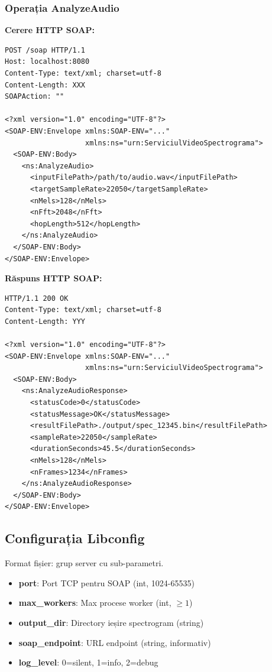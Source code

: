 \documentclass[12pt,a4paper,twoside]{article}
\begin{document}
\subsubsection{Operația AnalyzeAudio}

\textbf{Cerere HTTP SOAP:}

\begin{lstlisting}
POST /soap HTTP/1.1
Host: localhost:8080
Content-Type: text/xml; charset=utf-8
Content-Length: XXX
SOAPAction: ""

<?xml version="1.0" encoding="UTF-8"?>
<SOAP-ENV:Envelope xmlns:SOAP-ENV="..." 
                   xmlns:ns="urn:ServiciulVideoSpectrograma">
  <SOAP-ENV:Body>
    <ns:AnalyzeAudio>
      <inputFilePath>/path/to/audio.wav</inputFilePath>
      <targetSampleRate>22050</targetSampleRate>
      <nMels>128</nMels>
      <nFft>2048</nFft>
      <hopLength>512</hopLength>
    </ns:AnalyzeAudio>
  </SOAP-ENV:Body>
</SOAP-ENV:Envelope>
\end{lstlisting}

\textbf{Răspuns HTTP SOAP:}

\begin{lstlisting}
HTTP/1.1 200 OK
Content-Type: text/xml; charset=utf-8
Content-Length: YYY

<?xml version="1.0" encoding="UTF-8"?>
<SOAP-ENV:Envelope xmlns:SOAP-ENV="..." 
                   xmlns:ns="urn:ServiciulVideoSpectrograma">
  <SOAP-ENV:Body>
    <ns:AnalyzeAudioResponse>
      <statusCode>0</statusCode>
      <statusMessage>OK</statusMessage>
      <resultFilePath>./output/spec_12345.bin</resultFilePath>
      <sampleRate>22050</sampleRate>
      <durationSeconds>45.5</durationSeconds>
      <nMels>128</nMels>
      <nFrames>1234</nFrames>
    </ns:AnalyzeAudioResponse>
  </SOAP-ENV:Body>
</SOAP-ENV:Envelope>
\end{lstlisting}

\subsection{Configurația Libconfig}

Format fișier: grup server cu sub-parametri.

\begin{itemize}
    \item \textbf{port}: Port TCP pentru SOAP (int, 1024-65535)
    \item \textbf{max\_workers}: Max procese worker (int, $\geq 1$)
    \item \textbf{output\_dir}: Directory ieșire spectrogram (string)
    \item \textbf{soap\_endpoint}: URL endpoint (string, informativ)
    \item \textbf{log\_level}: 0=silent, 1=info, 2=debug
\end{itemize}
\end{document}
